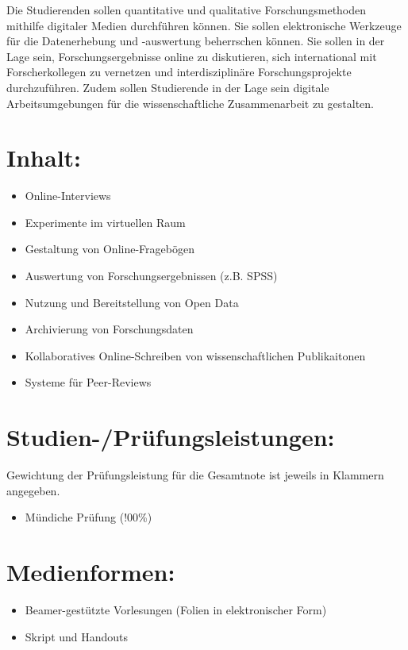 Die Studierenden sollen quantitative und qualitative Forschungsmethoden
mithilfe digitaler Medien durchführen können. Sie sollen elektronische
Werkzeuge für die Datenerhebung und -auswertung beherrschen können. Sie
sollen in der Lage sein, Forschungsergebnisse online zu diskutieren,
sich international mit Forscherkollegen zu vernetzen und
interdisziplinäre Forschungsprojekte durchzuführen. Zudem sollen
Studierende in der Lage sein digitale Arbeitsumgebungen für die
wissenschaftliche Zusammenarbeit zu gestalten.

\section*{Inhalt:}\label{inhalt-14}

\begin{itemize}
\tightlist
\item
  Online-Interviews
\item
  Experimente im virtuellen Raum
\item
  Gestaltung von Online-Fragebögen
\item
  Auswertung von Forschungsergebnissen (z.B. SPSS)
\item
  Nutzung und Bereitstellung von Open Data
\item
  Archivierung von Forschungsdaten
\item
  Kollaboratives Online-Schreiben von wissenschaftlichen Publikaitonen
\item
  Systeme für Peer-Reviews
\end{itemize}

\section*{Studien-/Prüfungsleistungen:}\label{studien-pruxfcfungsleistungen-14}

Gewichtung der Prüfungsleistung für die Gesamtnote ist jeweils in
Klammern angegeben.

\begin{itemize}
\tightlist
\item
  Mündiche Prüfung (!00\%)
\end{itemize}

\section*{Medienformen:}\label{medienformen-14}

\begin{itemize}
\tightlist
\item
  Beamer-gestützte Vorlesungen (Folien in elektronischer Form)
\item
  Skript und Handouts
\end{itemize}

